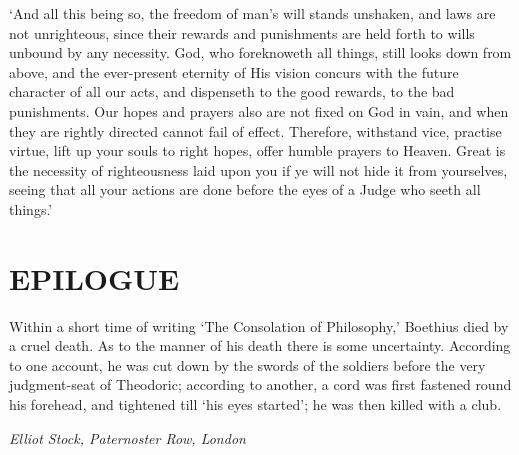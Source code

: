 \documentclass[12pt]{book}
\begin{document}
`And all this being so, the freedom of man's will stands unshaken, and
laws are not unrighteous, since their rewards and punishments are held
forth to wills unbound by any necessity. God, who foreknoweth all
things, still looks down from above, and the ever-present eternity of
His vision concurs with the future character of all our acts, and
dispenseth to the good rewards, to the bad punishments. Our hopes and
prayers also are not fixed on God in vain, and when they are rightly
directed cannot fail of effect. Therefore, withstand vice, practise
virtue, lift up your souls to right hopes, offer humble prayers to
Heaven. Great is the necessity of righteousness laid upon you if ye will
not hide it from yourselves, seeing that all your actions are done
before the eyes of a Judge who seeth all things.'



\backmatter

\chapter{EPILOGUE}


Within a short time of writing `The Consolation of Philosophy,' Boethius
died by a cruel death. As to the manner of his death there is some
uncertainty. According to one account, he was cut down by the swords of
the soldiers before the very judgment-seat of Theodoric; according to
another, a cord was first fastened round his forehead, and tightened
till `his eyes started'; he was then killed with a club.

\emph{Elliot Stock, Paternoster Row, London}




\end{document}
